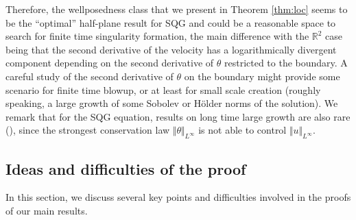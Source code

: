 \documentclass[10pt]{amsart}
\theoremstyle{definition}
\theoremstyle{remark}
\numberwithin{equation}{section}
\newcommand{\nrm}[1]{\Vert#1\Vert}
\newcommand{\0}{\emptyset}
\newcommand{\tht}{\theta}
\newcommand{\bbR}{\mathbb R}
\begin{document}
	Therefore, the wellposedness class that we present in Theorem \ref{thm:loc} seems to be the ``optimal'' half-plane result for SQG and could be a reasonable space to search for finite time singularity formation, the main difference with the $\bbR^{2}$ case being that the second derivative of the velocity  has a logarithmically divergent component depending on the second derivative of $\tht$ restricted to the boundary. A careful study of the second derivative of $\tht$ on the boundary might provide some scenario for finite time blowup, or at least for small scale creation (roughly speaking, a large growth of some Sobolev or H\"older norms of the solution). We remark that for the SQG equation, results on long time large growth are also rare (\cite{KN,DEJ,HeKi}), since the strongest conservation law $\nrm{\tht}_{L^{\infty}}$ is not able to control $\nrm{u}_{L^{\infty}}$. 
	 
	
	
	

	
	\subsection{Ideas and difficulties of the proof}
	
	In this section, we discuss several key points and difficulties involved in the proofs of our main results. 
	
	\medskip 
	
\end{document}
